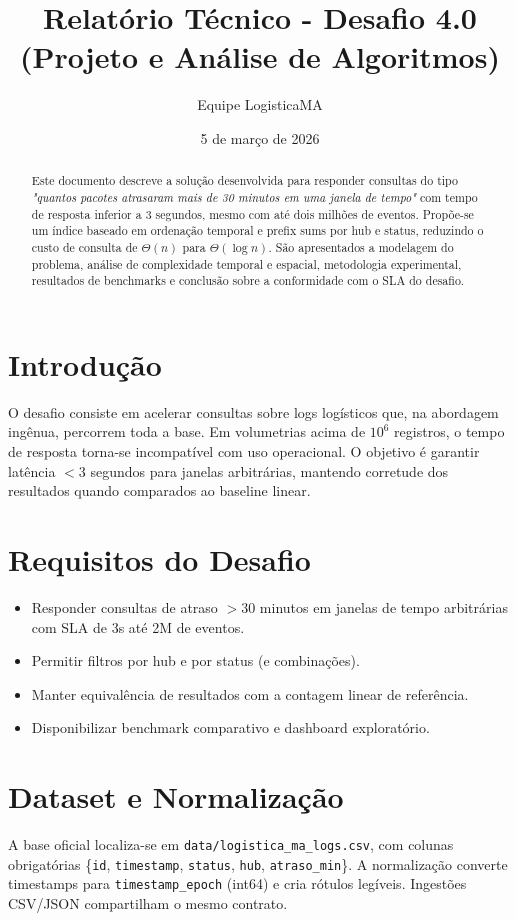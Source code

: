 \documentclass[12pt]{article}
\title{Relatório Técnico - Desafio 4.0 (Projeto e Análise de Algoritmos)}
\author{Equipe LogisticaMA}
\date{5 de março de 2026}
\begin{document}
\maketitle

\begin{abstract}
Este documento descreve a solução desenvolvida para responder consultas do tipo \emph{"quantos pacotes atrasaram mais de 30 minutos em uma janela de tempo"} com tempo de resposta inferior a 3 segundos, mesmo com até dois milhões de eventos. Propõe-se um índice baseado em ordenação temporal e prefix sums por hub e status, reduzindo o custo de consulta de $\Theta(n)$ para $\Theta(\log n)$. São apresentados a modelagem do problema, análise de complexidade temporal e espacial, metodologia experimental, resultados de benchmarks e conclusão sobre a conformidade com o SLA do desafio.
\end{abstract}

\section{Introdução}
O desafio consiste em acelerar consultas sobre logs logísticos que, na abordagem ingênua, percorrem toda a base. Em volumetrias acima de $10^6$ registros, o tempo de resposta torna-se incompatível com uso operacional. O objetivo é garantir latência $< 3$ segundos para janelas arbitrárias, mantendo corretude dos resultados quando comparados ao baseline linear.

\section{Requisitos do Desafio}
\begin{itemize}
  \item Responder consultas de atraso $> 30$ minutos em janelas de tempo arbitrárias com SLA de 3s até 2M de eventos.
  \item Permitir filtros por hub e por status (e combinações).
  \item Manter equivalência de resultados com a contagem linear de referência.
  \item Disponibilizar benchmark comparativo e dashboard exploratório.
\end{itemize}

\section{Dataset e Normalização}
A base oficial localiza-se em \texttt{data/logistica\_ma\_logs.csv}, com colunas obrigatórias \{\texttt{id}, \texttt{timestamp}, \texttt{status}, \texttt{hub}, \texttt{atraso\_min}\}. A normalização converte timestamps para \texttt{timestamp\_epoch} (int64) e cria rótulos legíveis. Ingestões CSV/JSON compartilham o mesmo contrato.
\end{document}
